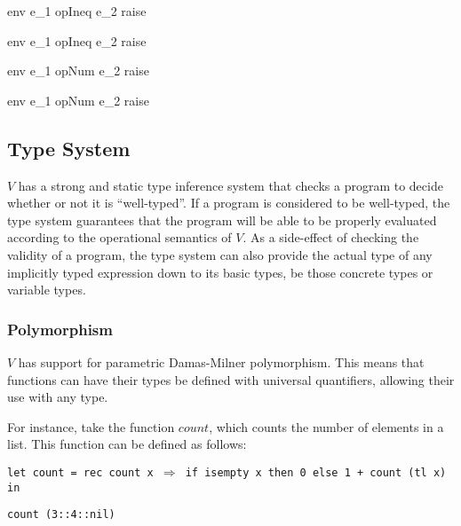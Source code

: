 \documentclass{article}
\def\code#1{\begin{footnotesize}\texttt{#1}\end{footnotesize}}
\begin{document}
    {\mbox{env} \vdash e_1 \; opIneq \; e_2 \Downarrow raise}

    {\mbox{env} \vdash e_1 \; opIneq \; e_2 \Downarrow raise}

    {\mbox{env} \vdash e_1 opNum e_2 \Downarrow raise}

    {\mbox{env} \vdash e_1 opNum e_2 \Downarrow raise}

\subsection{Type System}\label{Type System}

$V$ has a strong and static type inference system that checks a program to decide whether or not it is "`well-typed"'.
If a program is considered to be well-typed, the type system guarantees that the program will be able to be properly evaluated according to the operational semantics of $V$.
As a side-effect of checking the validity of a program, the type system can also provide the actual type of any implicitly typed expression down to its basic types, be those concrete types or variable types.

\subsubsection{Polymorphism}\label{Polymorphism}

$V$ has support for parametric Damas\hyp Milner polymorphism.
This means that functions can have their types be defined with universal quantifiers, allowing their use with any type.

For instance, take the function $count$, which counts the number of elements in a list.
This function can be defined as follows:

\smallskip

\code{let count = rec count x $\Rightarrow$ if isempty x then 0 else 1 + count (tl x) in}

\code{count (3::4::nil)}

\smallskip
\end{document}
